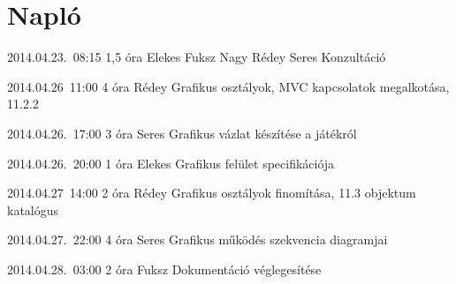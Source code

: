 %
\section{Napló}

\begin{naplo}

\bejegyzes
{2014.04.23.~08:15}
{1,5 óra}
{Elekes
Fuksz
Nagy
Rédey
Seres
}
{Konzultáció}

\bejegyzes
{2014.04.26~11:00}
{4 óra}
{Rédey}
{Grafikus osztályok, MVC kapcsolatok megalkotása, 11.2.2}

\bejegyzes
{2014.04.26.~17:00}
{3 óra}
{Seres}
{Grafikus vázlat készítése a játékról}

\bejegyzes
{2014.04.26.~20:00}
{1 óra}
{Elekes}
{Grafikus felület specifikációja}

\bejegyzes
{2014.04.27~14:00}
{2 óra}
{Rédey}
{Grafikus osztályok finomítása, 11.3 objektum katalógus}

\bejegyzes
{2014.04.27.~22:00}
{4 óra}
{Seres}
{Grafikus működés szekvencia diagramjai}

\bejegyzes
{2014.04.28.~03:00}
{2 óra}
{Fuksz}
{Dokumentáció véglegesítése}


\end{naplo}

